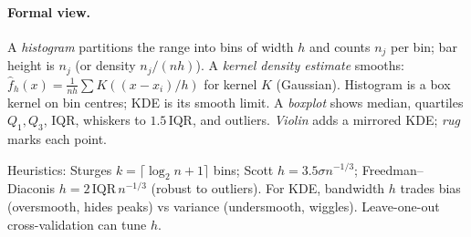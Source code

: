 \paragraph{Formal view.} A \emph{histogram} partitions the range into bins of width $h$ and counts $n_j$ per bin; bar height is $n_j$ (or density $n_j/(nh)$). A \emph{kernel density estimate} smooths: $\hat{f}_h(x)=\frac1{nh}\sum K((x-x_i)/h)$ for kernel $K$ (Gaussian). Histogram is a box kernel on bin centres; KDE is its smooth limit. A \emph{boxplot} shows median, quartiles $Q_1,Q_3$, IQR, whiskers to $1.5\,\text{IQR}$, and outliers. \emph{Violin} adds a mirrored KDE; \emph{rug} marks each point.

\begin{definition}\label{def:bin-rules}
Heuristics: Sturges $k=\lceil\log_2 n+1\rceil$ bins; Scott $h=3.5\sigma n^{-1/3}$; Freedman--Diaconis $h=2\,\text{IQR}\,n^{-1/3}$ (robust to outliers). For KDE, bandwidth $h$ trades bias (oversmooth, hides peaks) vs variance (undersmooth, wiggles). Leave-one-out cross-validation can tune $h$.
\end{definition}

